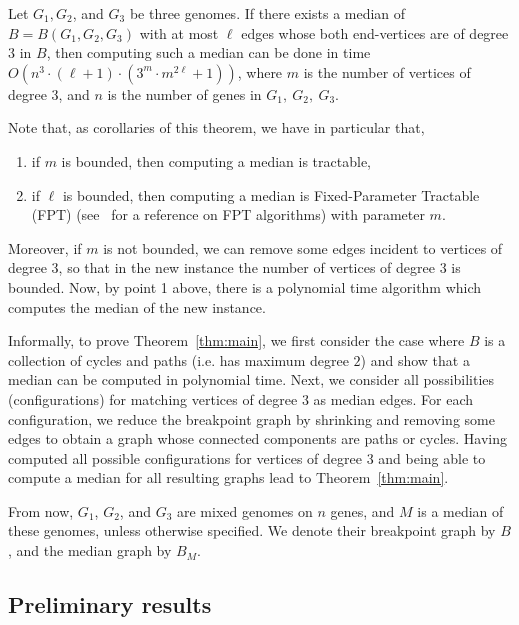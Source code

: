 \documentclass[10pt]{llncs}
\begin{document}
\begin{theorem}\label{thm:main}
  Let $G_1,G_2$, and $G_3$ be three genomes. If there exists a median
  of $B=B(G_1,G_2,G_3)$ with at most $\ell$ edges whose both
  end-vertices are of degree $3$ in $B$, then computing such a median
  can be done in time $O(n^{3} \cdot (\ell+1) \cdot(3^{m}\cdot
  m^{2\ell}+1))$, where $m$ is the number of vertices of degree $3$, and
  $n$ is the number of genes in $G_1,\ G_2,\ G_3$.
\end{theorem}

\begin{remark}\label{rem:corollaries}
  Note that, as corollaries of this theorem, we have in particular that, 
  \begin{enumerate}
  \item if $m$ is bounded, then computing a median is tractable,
  \item if $\ell$ is bounded, then computing a median is Fixed-Parameter
    Tractable (FPT) (see~\cite{niedermeier-2008} for a reference on FPT
    algorithms) with parameter $m$.  
  \end{enumerate}
  Moreover, if $m$ is not bounded, we can remove some edges incident
  to vertices of degree $3$, so that in the new instance the number of
  vertices of degree $3$ is bounded. Now, by point 1 above, there is a
  polynomial time algorithm which computes the median of the new
  instance. \end{remark} 

Informally, to prove Theorem~\ref{thm:main}, we first consider the
case where $B$ is a collection of cycles and paths (i.e. has maximum
degree $2$) and show that a median can be computed in polynomial
time. Next, we consider all possibilities (configurations) for
matching vertices of degree $3$ as median edges. For each configuration,
we reduce the breakpoint graph by shrinking and removing some edges to
obtain a graph whose connected components are paths or cycles. Having
computed all possible configurations for vertices of degree $3$ and
being able to compute a median for all resulting graphs lead to
Theorem~\ref{thm:main}.



From now, $G_1$, $G_2$, and $G_3$ are mixed genomes on $n$ genes, and
$M$ is a median of these genomes, unless otherwise specified. We
denote their breakpoint graph by $B$, and the median graph by $B_M$.

\subsection{Preliminary results}
\end{document}
